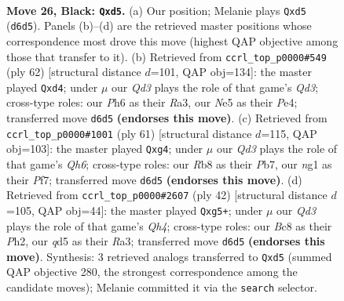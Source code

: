 \documentclass[11pt]{article}
\begin{document}
\clearpage

\begin{figure}[p]\centering
\begin{subfigure}{0.46\textwidth}\centering
\resizebox{\linewidth}{!}{%
\newchessgame
\chessboard[
  setfen={1rb1r1k1/p1p2pp1/3q3p/p1nQn2P/2P5/2P1P3/6R1/R1B1KBN1 b Q - 5 26},
  showmover=false,
  pgfstyle=straightmove, color=movearrow, markmove={d6-d5}
]}
\caption{}
\end{subfigure}\hfill
\begin{subfigure}{0.46\textwidth}\centering
\resizebox{\linewidth}{!}{%
\newchessgame
\chessboard[
  setfen={4r1k1/p2n1pb1/P1rp2p1/3N3p/3qP3/R2Q3P/3B1PP1/4R1K1 w - - 3 32},
  showmover=false,
  pgfstyle=straightmove, color=movearrow, markmove={d3-d4}
]}
\caption{}
\end{subfigure}
\\[4pt]
\begin{subfigure}{0.46\textwidth}\centering
\resizebox{\linewidth}{!}{%
\newchessgame
\chessboard[
  setfen={r5k1/1p3p1p/3pnr2/4p1p1/1PP3Q1/4PP1q/3R2N1/3BB1K1 b - - 4 31},
  showmover=false,
  pgfstyle=straightmove, color=movearrow, markmove={h3-g4}
]}
\caption{}
\end{subfigure}\hfill
\begin{subfigure}{0.46\textwidth}\centering
\resizebox{\linewidth}{!}{%
\newchessgame
\chessboard[
  setfen={1rb1qrk1/b6p/p2pp3/6p1/4P1PQ/RNNP4/1P3P1P/5RK1 w - - 0 22},
  showmover=false,
  pgfstyle=straightmove, color=movearrow, markmove={h4-g5}
]}
\caption{}
\end{subfigure}
\caption{\textbf{Move 26, Black: \texttt{Qxd5}.} (a) Our position; Melanie plays \texttt{Qxd5} (\texttt{d6d5}). Panels (b)--(d) are the retrieved master positions whose correspondence most drove this move (highest QAP objective among those that transfer to it). (b) Retrieved from \texttt{ccrl\_top\_p0000\#549} (ply 62) [structural distance $d$=101, QAP obj=134]: the master played \texttt{Qxd4}; under $\mu$ our \emph{Qd3} plays the role of that game's \emph{Qd3}; cross-type roles: our \emph{P}h6 as their \emph{R}a3, our \emph{N}e5 as their \emph{P}e4; transferred move \texttt{d6d5} \textbf{(endorses this move)}. (c) Retrieved from \texttt{ccrl\_top\_p0000\#1001} (ply 61) [structural distance $d$=115, QAP obj=103]: the master played \texttt{Qxg4}; under $\mu$ our \emph{Qd3} plays the role of that game's \emph{Qh6}; cross-type roles: our \emph{R}b8 as their \emph{P}b7, our \emph{n}g1 as their \emph{P}f7; transferred move \texttt{d6d5} \textbf{(endorses this move)}. (d) Retrieved from \texttt{ccrl\_top\_p0000\#2607} (ply 42) [structural distance $d$=105, QAP obj=44]: the master played \texttt{Qxg5+}; under $\mu$ our \emph{Qd3} plays the role of that game's \emph{Qh4}; cross-type roles: our \emph{B}c8 as their \emph{P}h2, our \emph{q}d5 as their \emph{R}a3; transferred move \texttt{d6d5} \textbf{(endorses this move)}. Synthesis: 3 retrieved analogs transferred to \texttt{Qxd5} (summed QAP objective 280, the strongest correspondence among the candidate moves); Melanie committed it via the \texttt{search} selector.}
\label{fig:thought-m51}
\end{figure}
\end{document}
